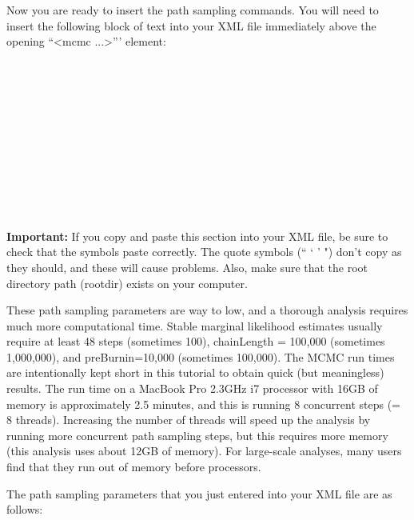 {Now you are ready to insert the path sampling commands. You will need to insert the following block of text into your XML file immediately above the opening ``<mcmc ...>''' element:

\small{
\\ 
\\
\\
\\
\\
\\
\\ 
\\
\\
\\
}


{\bf Important:} If you copy and paste this section into your XML file, be sure to check that the symbols paste correctly. The quote symbols (`` ` ' ") don't copy as they should, and these will cause problems. Also, make sure that the root directory path (rootdir) exists on your computer.

	These path sampling parameters are way to low, and a thorough analysis requires much more computational time. Stable marginal likelihood estimates usually require at least 48 steps (sometimes 100), chainLength = 100,000 (sometimes 1,000,000), and preBurnin=10,000 (sometimes 100,000). The MCMC run times are 
    intentionally kept short in this tutorial to obtain quick (but meaningless) results. The run time on a MacBook Pro 2.3GHz i7 processor with 16GB of memory is approximately 2.5 minutes, and this is running 8 concurrent steps (= 8 threads). Increasing the number of threads will speed up the analysis by running more concurrent path sampling steps, but this requires more memory (this analysis uses about 12GB of memory). For large-scale analyses, many users find that they run out of memory before processors.

The path sampling parameters that you just entered into your XML file are as follows:

}
